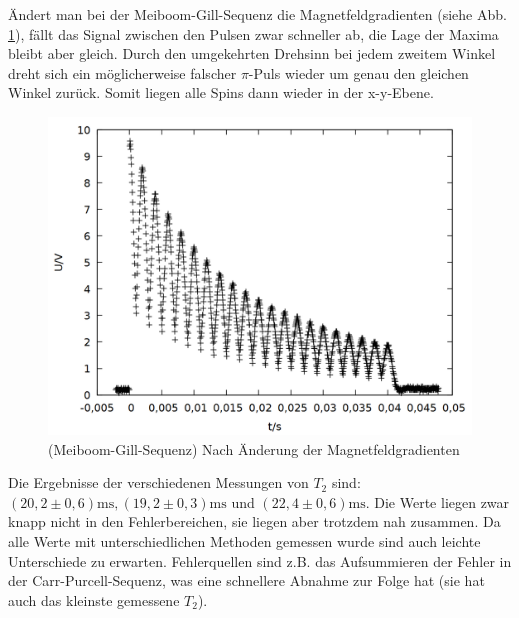 Ändert man bei der Meiboom-Gill-Sequenz die Magnetfeldgradienten (siehe Abb. \ref{fig:gill_b}), fällt das Signal zwischen den Pulsen zwar schneller ab, die Lage der Maxima bleibt aber gleich. Durch den umgekehrten Drehsinn bei jedem zweitem Winkel dreht sich ein möglicherweise falscher $\pi$-Puls wieder um genau den gleichen Winkel zurück. Somit liegen alle Spins dann wieder in der x-y-Ebene.\\
  
\begin{figure}[h]
\centering
\includegraphics[width=0.75\linewidth]{data/p402_443_data/meiboom_gill_sequenz/plot_161.png}
\caption{(Meiboom-Gill-Sequenz) Nach Änderung der Magnetfeldgradienten}
\label{fig:gill_b}
\end{figure}

Die Ergebnisse der verschiedenen Messungen von $T_2$ sind: $(20,2\pm 0,6) \si{\milli\second},  (19,2\pm 0,3) \si{\milli\second}$ und $(22,4\pm 0,6) \si{\milli\second}$. Die Werte liegen zwar knapp nicht in den Fehlerbereichen, sie liegen aber trotzdem nah zusammen. Da alle Werte mit unterschiedlichen Methoden gemessen wurde sind auch leichte Unterschiede zu erwarten. Fehlerquellen sind z.B. das Aufsummieren der Fehler in der Carr-Purcell-Sequenz, was eine schnellere Abnahme zur Folge hat (sie hat auch das kleinste gemessene $T_2$).
